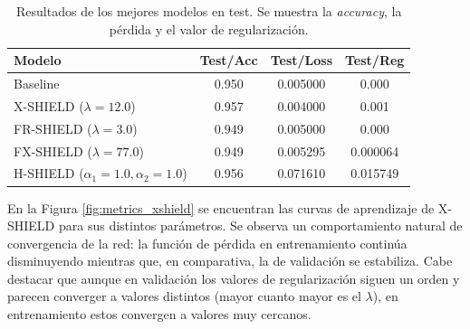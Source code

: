 \begin{table}[htbp]
\centering
{} %
\setlength{\arrayrulewidth}{0.8pt} %
\begin{tabular}{|l|ccc|}
\hline
\rowcolor{gray!50} Modelo & Test/Acc & Test/Loss & Test/Reg \\
\hline
Baseline & 0.950 & 0.005000 & 0.000 \\
X-SHIELD ($\lambda = 12.0$) & 0.957 & 0.004000 & 0.001 \\
FR-SHIELD ($\lambda = 3.0$) & 0.949 & 0.005000 & 0.000 \\
FX-SHIELD ($\lambda = 77.0$) & 0.949 & 0.005295 & 0.000064 \\
H-SHIELD ($\alpha_1=1.0, \alpha_2=1.0$) & 0.956 & 0.071610 & 0.015749 \\
\hline
\end{tabular}
\caption{Resultados de los mejores modelos en test. Se muestra la \textit{accuracy}, la pérdida y el valor de regularización.}
\label{tab:resultadosMejoresTest}
\end{table}


En la Figura \ref{fig:metrics_xshield} se encuentran las curvas de aprendizaje de X-SHIELD para sus distintos parámetros. Se observa un comportamiento natural de convergencia de la red: la función de pérdida en entrenamiento continúa disminuyendo mientras que, en comparativa, la de  validación se estabiliza. Cabe destacar que aunque en validación los valores de regularización siguen un orden y parecen converger a valores distintos (mayor cuanto mayor es el $\lambda$), en entrenamiento estos convergen a valores muy cercanos.


